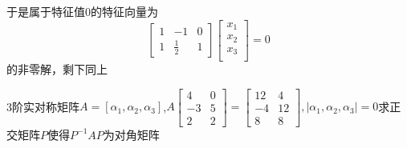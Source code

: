 \documentclass[lang=cn,10pt]{elegantbook}
\begin{document}
	于是属于特征值0的特征向量为
	\begin{equation*}
		\begin{bmatrix}
			1& -1 & 0\\
			1& \frac{1}{2}  &1
		\end{bmatrix}
		\left[ \begin{array}{c}
			x_1\\
			x_2\\
			x_3\\
		\end{array} \right] =0
	\end{equation*}
	的非零解，剩下同上
\begin{example}
	3阶实对称矩阵$A=[\alpha_{1},\alpha_{2},\alpha_{3}]$,$A\begin{bmatrix}
		4 & 0\\
		-3&5 \\
		2&2
	\end{bmatrix}=
	\begin{bmatrix}
		12 & 4\\
		-4&12 \\
		8&8
	\end{bmatrix},|\alpha_{1},\alpha_{2},\alpha_{3}|=0$求正交矩阵$P$使得$P^{-1}AP$为对角矩阵
\end{example}
\end{document}
